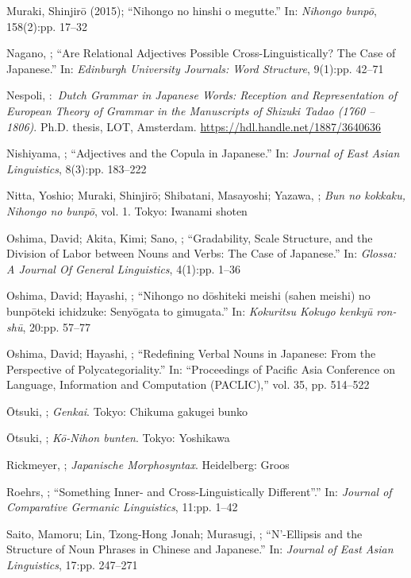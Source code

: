\documentclass[output=paper]{langscibook}
\begin{document}
Muraki, Shinjirō (2015); “Nihongo no hinshi o megutte.” In: \textit{Nihongo bunpō}, 158(2):pp. 17–32

Nagano, \citet{Akiko2016}; “Are Relational Adjectives Possible Cross-Linguistically? The Case of Japanese.” In: \textit{Edinburgh University Journals: Word Structure}, 9(1):pp. 42–71

Nespoli, \citet{Lorenzo2023}:~\textit{Dutch Grammar in Japanese Words: Reception and Representation of European Theory of Grammar in the Manuscripts of Shizuki Tadao (1760 – 1806)}. Ph.D. thesis, LOT, Amsterdam. \url{https://hdl.handle.net/1887/3640636} 

Nishiyama, \citet{Kunio1999}; “Adjectives and the Copula in Japanese.” In: \textit{Journal of East Asian Linguistics}, 8(3):pp. 183–222 

Nitta, Yoshio; Muraki, Shinjirō; Shibatani, Masayoshi; Yazawa, \citet{Masato2000}; \textit{Bun no kokkaku, Nihongo no bunpō}, vol. 1. Tokyo: Iwanami shoten 

Oshima, David; Akita, Kimi; Sano, \citet{Shin-ichiro2019}; “Gradability, Scale Structure, and the Division of Labor between Nouns and Verbs: The Case of Japanese.” In: \textit{Glossa: A Journal Of General Linguistics}, 4(1):pp. 1–36 

Oshima, David; Hayashi, \citet{Midori2021a}; “Nihongo no dōshiteki meishi (sahen meishi) no bunpōteki ichidzuke: Senyōgata to gimugata.” In: \textit{Kokuritsu Kokugo kenkyū ron-shū}, 20:pp. 57–77 

Oshima, David; Hayashi, \citet{Midori2021b}; “Redefining Verbal Nouns in Japanese: From the Perspective of Polycategoriality.” In: “Proceedings of Pacific Asia Conference on Language, Information and Computation (PACLIC),” vol. 35, pp. 514–522 

Ōtsuki, \citet{Fumihiko1891}; \textit{Genkai}. Tokyo: Chikuma gakugei bunko

Ōtsuki, \citet{Fumihiko1897}; \textit{Kō-Nihon bunten}. Tokyo: Yoshikawa

Rickmeyer, \citet{Jens1995}; \textit{Japanische Morphosyntax}. Heidelberg: Groos 

Roehrs, \citet{Dorian2008}; “Something Inner- and Cross-Linguistically Different”.” In: \textit{Journal of Comparative Germanic Linguistics}, 11:pp. 1–42

Saito, Mamoru; Lin, Tzong-Hong Jonah; Murasugi, \citet{Keiko2008}; “N’-Ellipsis and the Structure of Noun Phrases in Chinese and Japanese.” In: \textit{Journal of East Asian Linguistics}, 17:pp. 247–271 
\end{document}
